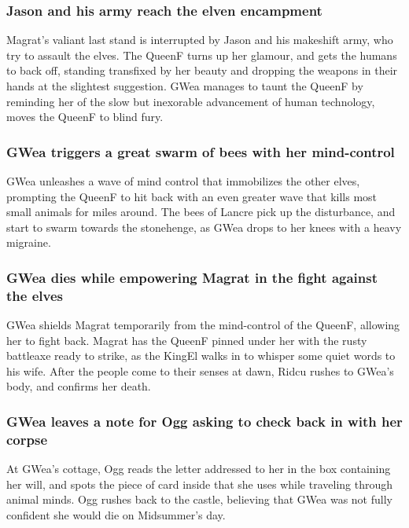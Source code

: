 \subsubsection{\Gls{Jason} and his army reach the elven encampment}
\Gls{Magrat}'s valiant last stand is interrupted by \Gls{Jason} and his makeshift army, who try to
assault the elves. The \Gls{QueenF} turns up her glamour, and gets the humans to back off, standing
transfixed by her beauty and dropping the weapons in their hands at the slightest suggestion.
\Gls{GWea} manages to taunt the \Gls{QueenF} by reminding her of the slow but inexorable advancement
of human technology, moves the \Gls{QueenF} to blind fury.

\subsubsection{\Gls{GWea} triggers a great swarm of bees with her mind-control}
\Gls{GWea} unleashes a wave of mind control that immobilizes the other elves, prompting the
\Gls{QueenF} to hit back with an even greater wave that kills most small animals for miles around.
The bees of Lancre pick up the disturbance, and start to swarm towards the stonehenge, as \Gls{GWea}
drops to her knees with a heavy migraine.

\subsubsection{\Gls{GWea} dies while empowering \Gls{Magrat} in the fight against the elves}
\Gls{GWea} shields \Gls{Magrat} temporarily from the mind-control of the \Gls{QueenF}, allowing her
to fight back. \Gls{Magrat} has the \Gls{QueenF} pinned under her with the rusty battleaxe ready
to strike, as the \Gls{KingEl} walks in to whisper some quiet words to his wife. After the people
come to their senses at dawn, \Gls{Ridcu} rushes to \Gls{GWea}'s body, and confirms her death.

\subsubsection{\Gls{GWea} leaves a note for \Gls{Ogg} asking to check back in with her corpse}
At \Gls{GWea}'s cottage, \Gls{Ogg} reads the letter addressed to her in the box containing her
will, and spots the piece of card inside that she uses while traveling through animal minds.
\Gls{Ogg} rushes back to the castle, believing that \Gls{GWea} was not fully confident she would die
on Midsummer's day.

